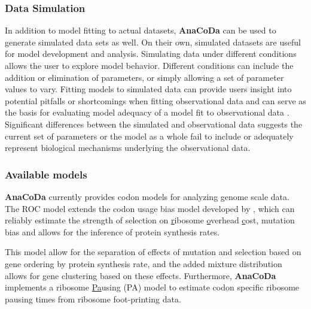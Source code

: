 \documentclass{bioinfo}
\newcommand{\package}{\textbf{AnaCoDa }} %
\begin{document}
\subsubsection*{Data Simulation}
In addition to model fitting to actual datasets, \package can be used to generate simulated data sets as well.
On their own, simulated datasets are useful for model development and analysis.
Simulating data under different conditions allows the user to explore model behavior. 
Different conditions can include the addition or elimination of parameters, or simply allowing a set of parameter values to vary.
Fitting models to simulated data can provide users insight into potential pitfalls or shortcomings when fitting observational data and can serve as the basis for evaluating model adequacy of a model fit to observational data \citep{gumi2015}.
Significant differences between the simulated and observational data suggests the current set of parameters or the model as a whole fail to include or adequately represent biological mechanisms underlying the observational data.
 
\subsubsection*{Available models}
\package currently provides codon models for analyzing genome scale data.
The ROC model extends the codon usage bias model developed by \citet{gilchrist2015,wallace2013,shah2011}, which can reliably estimate the strength of selection on \underline{r}ibosome \underline{o}verhead \underline{c}ost, mutation bias and allows for the inference of protein synthesis rates.

This model allow for the separation of effects of mutation and selection based on gene ordering by protein synthesis rate, and the added mixture distribution allows for gene clustering based on these effects.
Furthermore, \package implements a ribosome \underline{Pa}using (PA) model to estimate codon specific ribosome pausing times from ribosome foot-printing data.





\end{document}
